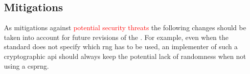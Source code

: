 \subsection{Mitigations}

As mitigations against \textcolor{red}{potential security threats} the following changes should be taken into account for future revisions of the \wa{}. For example, even when the standard does not specify which \gls{rng} has to be used, an implementer of such a cryptographic \gls{api} should always keep the potential lack of randomness when not using a \gls{csprng}. 